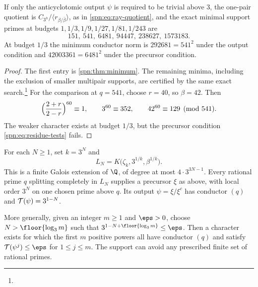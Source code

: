 \begin{proposition}\label{spn:prop:weak-minima}
If only the anticyclotomic output $\psi$ is required to be trivial above $3$,
the one-pair quotient is $C_{3^h}/\langle r_{\beta/\bar\beta}\rangle$, as in
\eqref{spn:eq:ray-quotient}, and the exact minimal support primes at budgets
$1,1/3,1/9,1/27,1/81,1/243$ are
\[
 151,\ 541,\ 6481,\ 94447,\ 238627,\ 1573183 .
\]
At budget $1/3$ the minimum conductor norm is $292681=541^2$ under the output
condition and $42003361=6481^2$ under the precursor condition.
\end{proposition}

\begin{proof}
The first entry is \cref{spn:thm:minimum}. The remaining minima, including
the exclusion of smaller multipair supports, are certified by the same exact
search.\footnote{}
For the comparison at $q=541$, choose $r=40$, so $\beta=42$. Then
\[
 \Bigl(\frac{2+r}{2-r}\Bigr)^{60}\equiv1,\qquad3^{60}\equiv352,\qquad
 42^{60}\equiv129\pmod{541}.
\]
The weaker character exists at budget $1/3$, but the precursor condition
\eqref{spn:eq:residue-tests} fails.
\end{proof}

\begin{theorem}\label{spn:thm:all-budgets}
For each $N\ge1$, set $k=3^N$ and
\[
 L_N=K\bigl(\zeta_k,3^{1/k},\beta^{1/k}\bigr).
\]
This is a finite Galois extension of $\Q$, of degree at most
$4\cdot3^{3N-1}$. Every rational prime $q$ splitting completely in $L_N$
supplies a precursor $\xi$ as above, with local order $3^N$ on one chosen
prime above $q$. Its output $\psi=\xi/\xi^c$ has conductor $(q)$ and
$\mathcal{T}(\psi)=3^{1-N}$.

More generally, given an integer $m\ge1$ and $\eps>0$, choose
$N>\floor{\log_3m}$ such that $3^{1-N+\floor{\log_3m}}\le\eps$. Then a
character exists for which the first $m$ positive powers all have conductor
$(q)$ and satisfy $\spnTame(\psi^j)\le\eps$ for $1\le j\le m$. The support
can avoid any prescribed finite set of rational primes.
\end{theorem}


